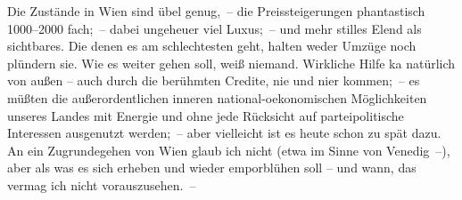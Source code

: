 \pstart
           Die Zustände in Wien sind übel genug, – die
               Preissteigerungen phantastisch 1000–2000 fach; – dabei ungeheuer viel Luxus; – und
               mehr stilles Elend als sichtbares. Die denen es am schlechtesten geht, halten weder
               Umzüge noch plündern sie. Wie es weiter gehen soll, weiß niemand. Wirkliche {\pb}Hilfe ka{\geminationn} natürlich
               von außen – auch durch die berühmten Credite, nie und ni{\geminationm}er kommen; – es müßten die außerordentlichen inneren \introOben{}national-\introOben{}oekonomischen Möglichkeiten unseres Landes mit Energie und ohne
               jede Rücksicht auf \introOben{}partei\introOben{}politische  Interessen ausgenutzt werden; – aber vielleicht ist
               es heute schon zu spät dazu. An ein Zugrundegehen von Wien glaub ich nicht (etwa im Sinne von Venedig –), aber als was es sich erheben und wieder emporblühen soll – und
               wann, das vermag ich nicht vorauszusehen. –\pend
           
